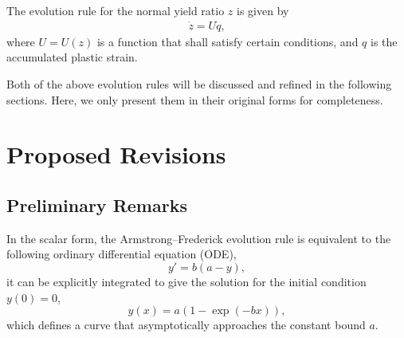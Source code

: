 The evolution rule for the normal yield ratio $z$ is given by
\begin{gather}\label{eq:original_z}
    \dot{z}=U\dot{q},
\end{gather}
where $U=U\left(z\right)$ is a function that shall satisfy certain conditions, and $q$ is the accumulated plastic strain.

Both of the above evolution rules will be discussed and refined in the following sections.
Here, we only present them in their original forms for completeness.
\section{Proposed Revisions}\label{sec:revised}
\subsection{Preliminary Remarks}
In the scalar form, the Armstrong--Frederick evolution rule \citep{Frederick2007} is equivalent to the following ordinary differential equation (ODE),
\begin{equation}\label{eq:af_ode}
    y'=b\left(a-y\right),
\end{equation}
it can be explicitly integrated to give the solution for the initial condition $y(0)=0$,
\begin{equation}
    y(x)=a\left(1-\exp\left(-bx\right)\right),
\end{equation}
which defines a curve that asymptotically approaches the constant bound $a$.

